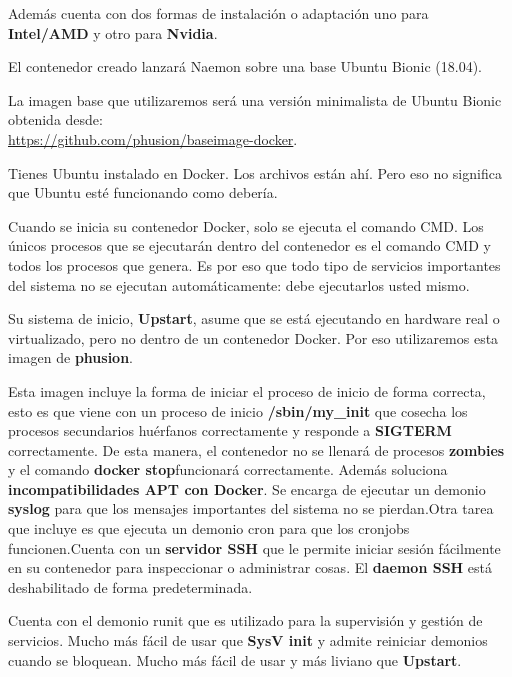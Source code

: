 Además cuenta con dos formas de instalación o adaptación uno para \textbf{Intel/AMD} y otro para \textbf{Nvidia}.

El contenedor creado lanzará Naemon sobre una base Ubuntu Bionic (18.04).

La imagen base que utilizaremos será una versión minimalista de Ubuntu Bionic obtenida desde:\\
 \url{https://github.com/phusion/baseimage-docker}.

Tienes Ubuntu instalado en Docker. Los archivos están ahí. Pero eso no significa que Ubuntu esté funcionando como debería.

Cuando se inicia su contenedor Docker, solo se ejecuta el comando CMD. Los únicos procesos que se ejecutarán dentro del contenedor es el comando CMD y todos los procesos que genera. Es por eso que todo tipo de servicios importantes del sistema no se ejecutan automáticamente: debe ejecutarlos usted mismo.

Su sistema de inicio, \textbf{Upstart}, asume que se está ejecutando en hardware real o virtualizado, pero no dentro de un contenedor Docker. Por eso utilizaremos esta imagen de \textbf{phusion}.

Esta imagen incluye la forma de iniciar el proceso de inicio de forma correcta, esto es que viene con un proceso de inicio \textbf{/sbin/my\_init} que cosecha los procesos secundarios huérfanos correctamente y responde a \textbf{SIGTERM} correctamente. De esta manera, el contenedor no se llenará de procesos \textbf{zombies} y el comando \textbf{docker stop}funcionará correctamente.
\newpage
Además soluciona \textbf{incompatibilidades APT con Docker}. Se encarga de ejecutar un demonio \textbf{syslog} para que los mensajes importantes del sistema no se pierdan.Otra tarea que incluye es que ejecuta un demonio cron para que los cronjobs funcionen.Cuenta con un \textbf{servidor SSH} que le permite iniciar sesión fácilmente en su contenedor para inspeccionar o administrar cosas. El \textbf{daemon SSH} está deshabilitado de forma predeterminada.

Cuenta con el demonio runit que es utilizado para la supervisión y gestión de servicios. Mucho más fácil de usar que \textbf{SysV init} \cite{SysVinit} y admite reiniciar demonios cuando se bloquean. Mucho más fácil de usar y más liviano que \textbf{Upstart}.

